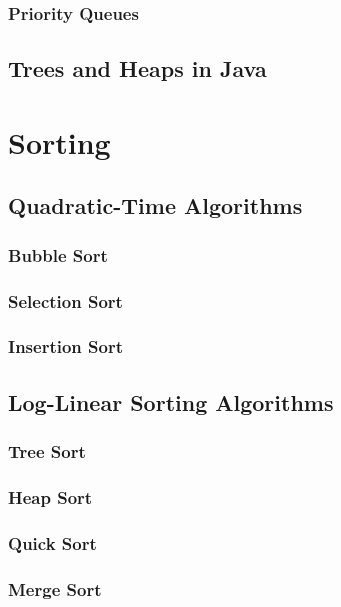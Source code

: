 \documentclass[10pt,a4paper]{book}
\begin{document}
\subsection{Priority Queues}

\section{Trees and Heaps in Java}
\chapter{Sorting}


\section{Quadratic-Time Algorithms}

\subsection{Bubble Sort}

\subsection{Selection Sort}

\subsection{Insertion Sort}


\section{Log-Linear Sorting Algorithms}

\subsection{Tree Sort}
\subsection{Heap Sort}
\subsection{Quick Sort}
\subsection{Merge Sort}
\end{document}
